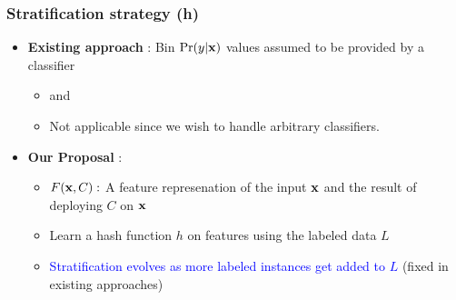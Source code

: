 \documentclass[usenames,dvipsnames, 11pt]{beamer}
\newcommand{\vek}[1]{{\bf {#1}}}
\newcommand{\vx}{{\vek{x}}}
\newlength{\wideitemsep}
\let\olditem\item
\renewcommand{\item}{\setlength{\itemsep}{\wideitemsep}\olditem}
\begin{document}
\begin{frame}
\frametitle{Stratification strategy (h)}
\begin{itemize}
\pause
\item \textbf{Existing approach} : Bin $\Pr(y|\vx)$ values assumed to be provided by a classifier 
  \begin{itemize}
  \item \cite{bennett10} and \cite{druck11} %
  \item Not applicable since we wish to handle arbitrary classifiers.
  \end{itemize}
  \pause  
\item \textbf{Our Proposal} : 
  \begin{itemize}
  \pause
  \item $F(\vx,C):$ A feature represenation of the input $\vx$ and the result of deploying $C$ on  $\vx$
  \item Learn a hash function $h$ on features using the labeled data $L$
  \item \textcolor{Blue}{Stratification evolves as more labeled instances get added to $L$} (fixed in existing approaches)
  \end{itemize}
\end{itemize}
\end{frame}
\end{document}
